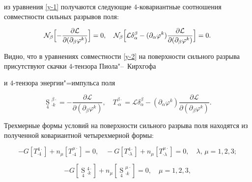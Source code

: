 из уравнения \eqref{y-1} получаются следующие $4$-ковариантные соотношения совместности сильных разрывов поля:

\begin{equation}

\label{y-2}

{\mathcal N}_\beta \Bigl[ {-\displaystyle\frac{\partial{\mathcal L}}{\partial (\partial _\beta \varphi ^k)}}\Bigr]=0,\quad

{\mathcal N}_\beta \Bigl[ {{\mathcal L}\delta _\alpha ^\beta -(\partial _\alpha \varphi ^k)\displaystyle\frac{\partial{\mathcal L}}{\partial (\partial _\beta \varphi ^k)}}\Bigr]=0.

\end{equation}



Видно, что в уравнениях совместности \eqref{y-2} на поверхности сильного разрыва присутствуют скачки $4$-тензора Пиола"--~Кирхгофа

и $4$-тензора энергии"=импульса поля

\begin{equation}

\label{S-T-tensor}

{\mathop {S}\limits_{4}}{}_{\cdot k}^{\beta\cdot}=-\displaystyle\frac{\partial{\mathcal L}}{\partial (\partial _\beta \varphi ^k)},\quad

T_{\cdot \alpha }^{\beta \cdot }= {\mathcal L}\delta _\alpha ^\beta   -

(\partial _\alpha  \varphi ^k )\frac{{\partial{\mathcal L}}}

{{\partial (\partial _\beta  \varphi ^k )}}.

\end{equation}



Трехмерные формы условий на поверхности сильного разрыва поля находятся из полученной ковариантной четырехмерной формы:

\begin{equation}\label{3condcomp}

-G \left[ {T_{\cdot 4}^{4\cdot}}\right] +{ n_\mu}\left[ {T_{\cdot 4}^{ \mu\cdot}}\right]  =0,\quad

-G\left[ {T_{\cdot\lambda}^{ 4\cdot}}\right] + { n_\mu}\left[ {T_{\cdot\lambda}^{ \mu\cdot}}\right] =0,\quad

\lambda,\,\mu= 1, 2, 3;

\end{equation}

\begin{equation}\nonumber

-G [ {\mathop {S}\limits_{4}}{}_{\cdot k}^{4\cdot}] +{ n_\mu}[ {\mathop {S}\limits_{4}}{}_{\cdot k}^{\mu\cdot}]  =0,\quad

\mu=1, 2, 3,

\end{equation}

